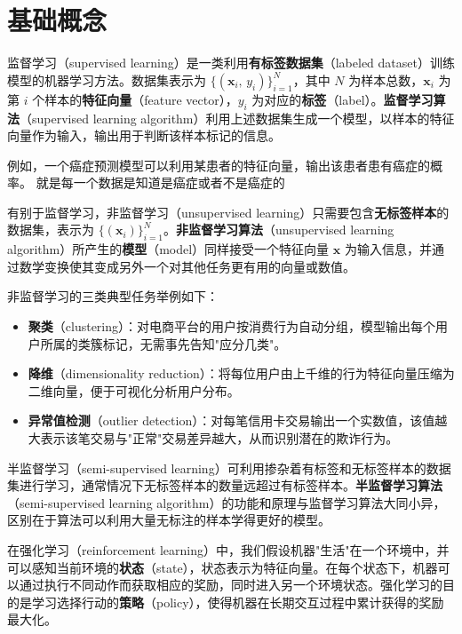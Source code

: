 \chapter{基础概念}
\begin{definition}[监督学习]
监督学习（supervised learning）是一类利用\textbf{有标签数据集}（labeled dataset）训练模型的机器学习方法。数据集表示为 $\{(\boldsymbol{x}_i,\, y_i)\}_{i=1}^{N}$，其中 $N$ 为样本总数，$\boldsymbol{x}_i$ 为第 $i$ 个样本的\textbf{特征向量}（feature vector），$y_i$ 为对应的\textbf{标签}（label）。\textbf{监督学习算法}（supervised learning algorithm）利用上述数据集生成一个模型，以样本的特征向量作为输入，输出用于判断该样本标记的信息。
\end{definition}
例如，一个癌症预测模型可以利用某患者的特征向量，输出该患者患有癌症的概率。
就是每一个数据是知道是癌症或者不是癌症的
\begin{definition}[非监督学习]
有别于监督学习，非监督学习（unsupervised learning）只需要包含\textbf{无标签样本}的数据集，表示为 $\{(\boldsymbol{x}_i)\}_{i=1}^{N}$。\textbf{非监督学习算法}（unsupervised learning algorithm）所产生的\textbf{模型}（model）同样接受一个特征向量 $\boldsymbol{x}$ 为输入信息，并通过数学变换使其变成另外一个对其他任务更有用的向量或数值。
\end{definition}
\begin{note}
非监督学习的三类典型任务举例如下：
\begin{itemize}
    \item \textbf{聚类}（clustering）：对电商平台的用户按消费行为自动分组，模型输出每个用户所属的类簇标记，无需事先告知"应分几类"。
    \item \textbf{降维}（dimensionality reduction）：将每位用户由上千维的行为特征向量压缩为二维向量，便于可视化分析用户分布。
    \item \textbf{异常值检测}（outlier detection）：对每笔信用卡交易输出一个实数值，该值越大表示该笔交易与"正常"交易差异越大，从而识别潜在的欺诈行为。
\end{itemize}
\end{note}
\begin{definition}[半监督学习]
半监督学习（semi-supervised learning）可利用掺杂着有标签和无标签样本的数据集进行学习，通常情况下无标签样本的数量远超过有标签样本。\textbf{半监督学习算法}（semi-supervised learning algorithm）的功能和原理与监督学习算法大同小异，区别在于算法可以利用大量无标注的样本学得更好的模型。
\end{definition}
\begin{definition}[强化学习]
在强化学习（reinforcement learning）中，我们假设机器"生活"在一个环境中，并可以感知当前环境的\textbf{状态}（state），状态表示为特征向量。在每个状态下，机器可以通过执行不同动作而获取相应的奖励，同时进入另一个环境状态。强化学习的目的是学习选择行动的\textbf{策略}（policy），使得机器在长期交互过程中累计获得的奖励最大化。
\end{definition}

